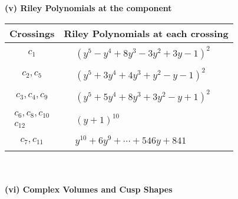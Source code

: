 \documentclass[1p]{elsarticle_modified}
\theoremstyle{definition}
\begin{document}
\newpage\renewcommand{\arraystretch}{1}
\flushleft \textbf{(v) Riley Polynomials at the component}\newline \\
\begin{tabular}{m{50pt}|m{274pt}}
Crossings & \hspace{64pt}Riley Polynomials at each crossing \\
\hline $$\begin{aligned}c_{1}\end{aligned}$$&$\begin{aligned}
&(y^5- y^4+8 y^3-3 y^2+3 y-1)^2
\end{aligned}$\\
\hline $$\begin{aligned}c_{2},c_{5}\end{aligned}$$&$\begin{aligned}
&(y^5+3 y^4+4 y^3+y^2- y-1)^2
\end{aligned}$\\
\hline $$\begin{aligned}c_{3},c_{4},c_{9}\end{aligned}$$&$\begin{aligned}
&(y^5+5 y^4+8 y^3+3 y^2- y+1)^2
\end{aligned}$\\
\hline $$\begin{aligned}c_{6},c_{8},c_{10}\\c_{12}\end{aligned}$$&$\begin{aligned}
&(y+1)^{10}
\end{aligned}$\\
\hline $$\begin{aligned}c_{7},c_{11}\end{aligned}$$&$\begin{aligned}
&y^{10}+6 y^9+\cdots+546 y+841
\end{aligned}$\\
\hline
\end{tabular}\\~\\
\newpage\flushleft \textbf{(vi) Complex Volumes and Cusp Shapes}
\end{document}
